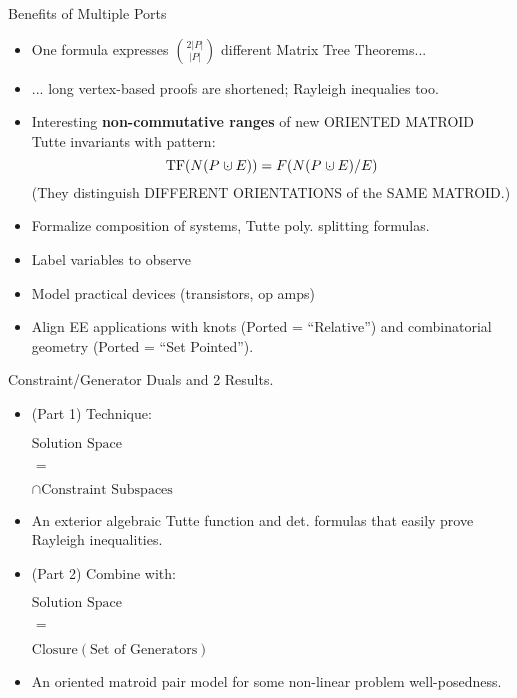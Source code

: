 \documentclass{beamer}
\newcommand{\dunion}
{\mbox{\hbox{\hskip0.45em$\cdot$\hskip-0.44em$\cup$\hskip0.2em}}}
\begin{document}
\begin{frame}{Benefits of Multiple Ports}

\begin{itemize}
\item One formula expresses $\binom{2|P|}{|P|}$ different Matrix Tree 
Theorems...
\item
... long vertex-based proofs are shortened; Rayleigh inequalies too.
\item
Interesting \textbf{non-commutative ranges} of
new ORIENTED MATROID Tutte invariants with pattern:
\[
\text{TF}(N(P\dunion E)) = F(N(P\dunion E)/E)
\]
(They distinguish DIFFERENT ORIENTATIONS of the SAME MATROID.)
\item
Formalize composition of systems\cite{NarayananDecompVS1986}, 
Tutte poly. splitting formulas.
\item
Label variables to observe
\item
Model practical devices (transistors, op amps)
\item 
Align EE applications with knots (Ported = ``Relative'')
and combinatorial geometry (Ported = ``Set Pointed'').  
\end{itemize}
\end{frame}

\begin{frame}{Constraint/Generator Duals and 2 Results.}
\begin{minipage}{0.48\textwidth}

\begin{itemize}
\item
(Part 1) Technique:
\begin{center}$\text{Solution Space}$\end{center}
\begin{center}$=$\end{center}
\begin{center}$\cap \text{Constraint Subspaces}$\end{center}
\item
An
exterior algebraic Tutte function
and det. formulas that
easily prove Rayleigh inequalities.
\end{itemize}

\end{minipage}
\begin{minipage}{0.48\textwidth}

\begin{itemize}
\item
(Part 2) Combine with:
\begin{center}$\text{Solution Space}$ \end{center}
\begin{center}$=$ \end{center}
\begin{center}$\text{Closure}(\text{Set of Generators})$\end{center}
\item
An oriented matroid pair model
for some non-linear problem
well-posedness.
\end{itemize}
\end{minipage}
\end{frame}
\end{document}
